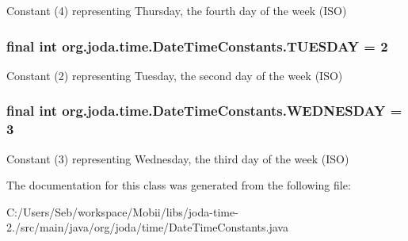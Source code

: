 Constant (4) representing Thursday, the fourth day of the week (I\-S\-O) \hypertarget{classorg_1_1joda_1_1time_1_1_date_time_constants_a7106d0fa721cea97a63572d33705f8e7}{
\subsubsection[{T\-U\-E\-S\-D\-A\-Y}]{\setlength{\rightskip}{0pt plus 5cm}final int org.\-joda.\-time.\-Date\-Time\-Constants.\-T\-U\-E\-S\-D\-A\-Y = 2\hspace{0.3cm}{\ttfamily [static]}}}\label{classorg_1_1joda_1_1time_1_1_date_time_constants_a7106d0fa721cea97a63572d33705f8e7}
Constant (2) representing Tuesday, the second day of the week (I\-S\-O) \hypertarget{classorg_1_1joda_1_1time_1_1_date_time_constants_ad41ca1fec0fa86e26f1d36985b482da0}{
\subsubsection[{W\-E\-D\-N\-E\-S\-D\-A\-Y}]{\setlength{\rightskip}{0pt plus 5cm}final int org.\-joda.\-time.\-Date\-Time\-Constants.\-W\-E\-D\-N\-E\-S\-D\-A\-Y = 3\hspace{0.3cm}{\ttfamily [static]}}}\label{classorg_1_1joda_1_1time_1_1_date_time_constants_ad41ca1fec0fa86e26f1d36985b482da0}
Constant (3) representing Wednesday, the third day of the week (I\-S\-O) 

The documentation for this class was generated from the following file\-:\begin{DoxyCompactItemize}
\item 
C\-:/\-Users/\-Seb/workspace/\-Mobii/libs/joda-\/time-\/2./src/main/java/org/joda/time/Date\-Time\-Constants.\-java\end{DoxyCompactItemize}
